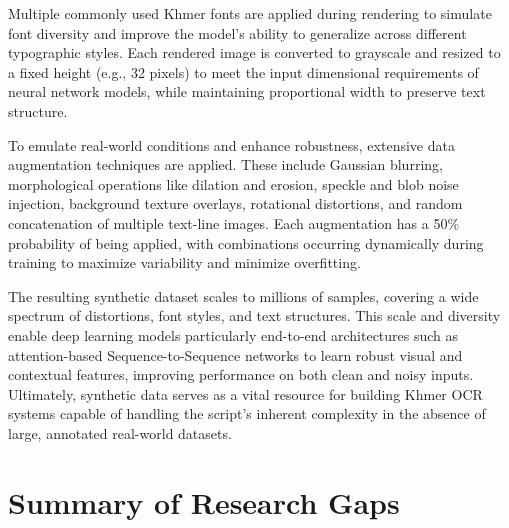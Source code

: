 {Multiple commonly used Khmer fonts are applied during rendering to simulate font diversity and 
improve the model's ability to generalize across different typographic styles. Each rendered 
image is converted to grayscale and resized to a fixed height (e.g., 32 pixels) to meet the input 
dimensional requirements of neural network models, while maintaining proportional width to preserve 
text structure.

To emulate real-world conditions and enhance robustness, extensive data augmentation techniques 
are applied. These include Gaussian blurring, morphological operations like dilation and erosion, 
speckle and blob noise injection, background texture overlays, rotational distortions, and random 
concatenation of multiple text-line images. Each augmentation has a 50\% probability of being applied, 
with combinations occurring dynamically during training to maximize variability and minimize overfitting.

The resulting synthetic dataset scales to millions of samples, covering a wide spectrum of distortions, 
font styles, and text structures. This scale and diversity enable deep learning models particularly 
end-to-end architectures such as attention-based Sequence-to-Sequence networks to learn robust 
visual and contextual features, improving performance on both clean and noisy inputs. Ultimately, 
synthetic data serves as a vital resource for building Khmer OCR systems capable of handling the 
script’s inherent complexity in the absence of large, annotated real-world datasets.


\section{Summary of Research Gaps}
\label{sec:research-gaps}

}
